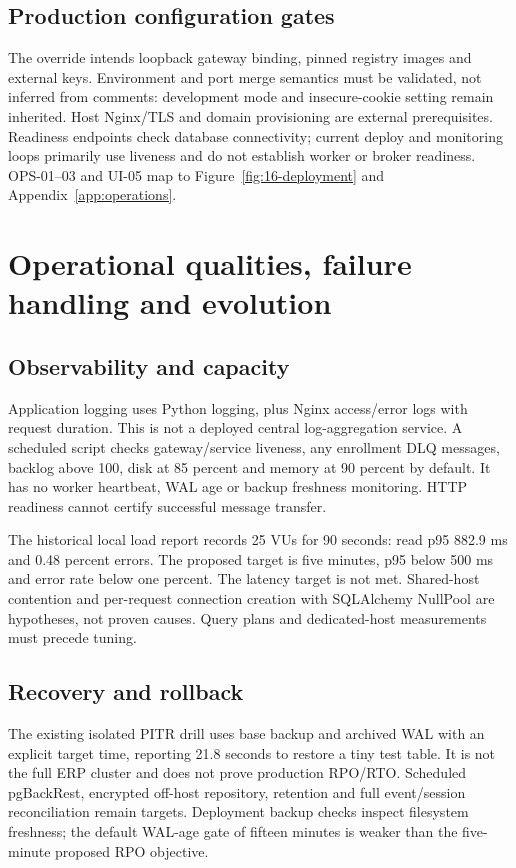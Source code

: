 \documentclass[10pt,a4paper]{article}
\begin{document}
\subsection{Production configuration gates}
The override intends loopback gateway binding, pinned registry images and external
keys. Environment and port merge semantics must be validated, not inferred from
comments: development mode and insecure-cookie setting remain inherited.
Host Nginx/TLS and domain provisioning are external prerequisites.
Readiness endpoints check database connectivity; current deploy and monitoring
loops primarily use liveness and do not establish worker or broker readiness.
OPS-01--03 and UI-05 map to Figure~\ref{fig:16-deployment} and
Appendix~\ref{app:operations}.

\clearpage
\section{Operational qualities, failure handling and evolution}
\subsection{Observability and capacity}
Application logging uses Python logging, plus Nginx access/error logs with request
duration. This is not a deployed central log-aggregation service. A scheduled script
checks gateway/service liveness, any enrollment DLQ messages, backlog above 100,
disk at 85 percent and memory at 90 percent by default. It has no worker heartbeat,
WAL age or backup freshness monitoring. HTTP readiness cannot certify successful
message transfer.

The historical local load report records 25 VUs for 90 seconds: read p95 882.9 ms
and 0.48 percent errors. The proposed target is five minutes, p95 below 500 ms and
error rate below one percent. The latency target is not met. Shared-host contention
and per-request connection creation with SQLAlchemy NullPool are hypotheses,
not proven causes. Query plans and dedicated-host measurements must precede tuning.

\subsection{Recovery and rollback}
The existing isolated PITR drill uses base backup and archived WAL with an explicit
target time, reporting 21.8 seconds to restore a tiny test table. It is not the full
ERP cluster and does not prove production RPO/RTO. Scheduled pgBackRest, encrypted
off-host repository, retention and full event/session reconciliation remain targets.
Deployment backup checks inspect filesystem freshness; the default WAL-age gate
of fifteen minutes is weaker than the five-minute proposed RPO objective.
\end{document}

